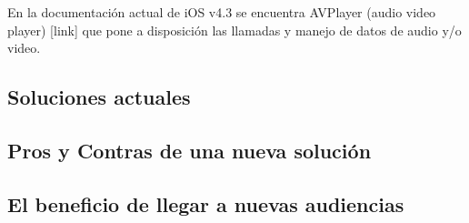 En la documentación actual de iOS v4.3 se encuentra AVPlayer (audio video player) [link] que pone a disposición las llamadas y manejo de datos de audio y/o video.


\subsection{Soluciones actuales}
\subsection{Pros y Contras de una nueva solución}
\subsection{El beneficio de llegar a nuevas audiencias}





